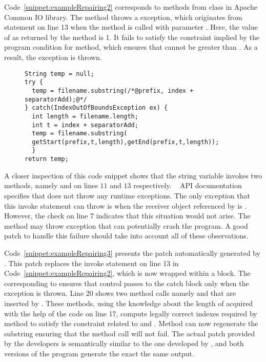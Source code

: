 Code~\ref{snippet:exampleRepairing2} corresponds to methods from
 class in Apache Common IO library. The method
 throws a  exception,
which originates from statement  on line 13 when the method is called with parameter
.  Here, the value of  as returned by the method
 is 1. It fails to satisfy the constraint implied by the
program condition  for 
method, which ensures that  cannot be greater than
. As a result, the exception is thrown.


\begin{figure}[t]
\centering
\begin{lstlisting}
String temp = null;
try {
  temp = filename.substring(/*@prefix, index + separatorAdd);@*/
} catch(IndexOutOfBoundsException ex) {
  int length = filename.length;
  int t = index + separatorAdd;
  temp = filename.substring(
  getStart(prefix,t,length),getEnd(prefix,t,length));
  }
return temp;
\end{lstlisting}
\end{figure}

A closer inspection of this code snippet shows that the string variable
 invokes two methods, namely  and 
on lines $11$ and $13$ respectively. \java\  API documentation
specifies that  does not throw any runtime exceptions. The only
exception that this invoke statement can throw is when the receiver object
referenced by  is . However, the check on line $7$
indicates that this situation would not arise. The method  may
throw  exception that can potentially crash the
program. A good patch to handle this failure should take into account all of
these observations. 

Code~\ref{snippet:exampleRepairing3} presents the patch automatically generated
by \tool. This patch replaces the invoke statement on line 13 in
Code~\ref{snippet:exampleRepairing2}, which is now wrapped within a
 block. The  corresponding to
ensures that control passes
to the catch block only when the exception is thrown. Line 20 shows two method
calls namely  and  that are inserted by \tool. These
methods, using the knowledge about the length of  acquired with
the help of the code on line 17, compute legally correct indexes required by
 method to satisfy the constraint related to 
and . Method  can now regenerate the substring
ensuring that the method call will not fail. The actual patch provided by the
developers is semantically similar to the one developed by \tool, and both
versions of the program generate the exact the same output.

